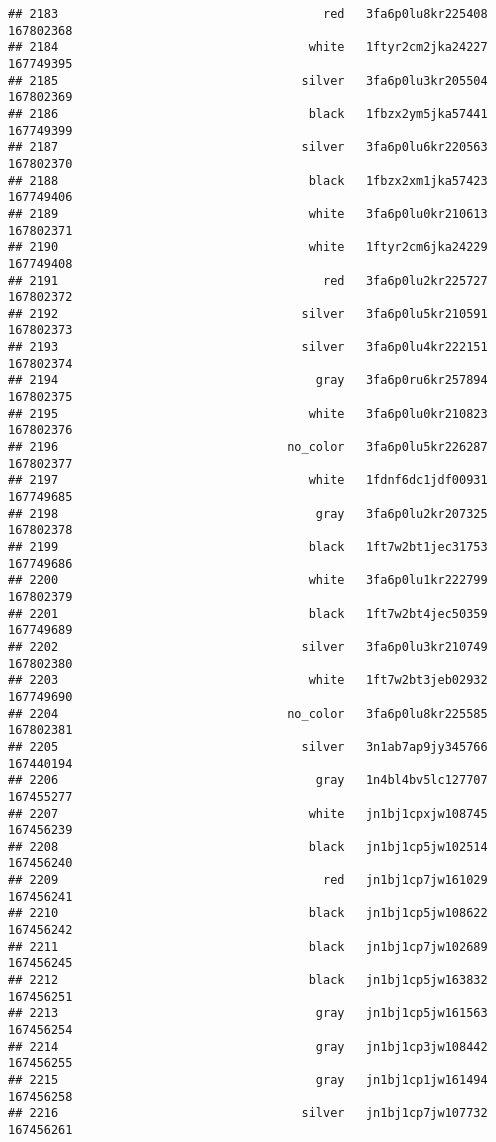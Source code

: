 \documentclass[
]{article}
\begin{document}
\begin{verbatim}
## 2183                                     red   3fa6p0lu8kr225408 167802368
## 2184                                   white   1ftyr2cm2jka24227 167749395
## 2185                                  silver   3fa6p0lu3kr205504 167802369
## 2186                                   black   1fbzx2ym5jka57441 167749399
## 2187                                  silver   3fa6p0lu6kr220563 167802370
## 2188                                   black   1fbzx2xm1jka57423 167749406
## 2189                                   white   3fa6p0lu0kr210613 167802371
## 2190                                   white   1ftyr2cm6jka24229 167749408
## 2191                                     red   3fa6p0lu2kr225727 167802372
## 2192                                  silver   3fa6p0lu5kr210591 167802373
## 2193                                  silver   3fa6p0lu4kr222151 167802374
## 2194                                    gray   3fa6p0ru6kr257894 167802375
## 2195                                   white   3fa6p0lu0kr210823 167802376
## 2196                                no_color   3fa6p0lu5kr226287 167802377
## 2197                                   white   1fdnf6dc1jdf00931 167749685
## 2198                                    gray   3fa6p0lu2kr207325 167802378
## 2199                                   black   1ft7w2bt1jec31753 167749686
## 2200                                   white   3fa6p0lu1kr222799 167802379
## 2201                                   black   1ft7w2bt4jec50359 167749689
## 2202                                  silver   3fa6p0lu3kr210749 167802380
## 2203                                   white   1ft7w2bt3jeb02932 167749690
## 2204                                no_color   3fa6p0lu8kr225585 167802381
## 2205                                  silver   3n1ab7ap9jy345766 167440194
## 2206                                    gray   1n4bl4bv5lc127707 167455277
## 2207                                   white   jn1bj1cpxjw108745 167456239
## 2208                                   black   jn1bj1cp5jw102514 167456240
## 2209                                     red   jn1bj1cp7jw161029 167456241
## 2210                                   black   jn1bj1cp5jw108622 167456242
## 2211                                   black   jn1bj1cp7jw102689 167456245
## 2212                                   black   jn1bj1cp5jw163832 167456251
## 2213                                    gray   jn1bj1cp5jw161563 167456254
## 2214                                    gray   jn1bj1cp3jw108442 167456255
## 2215                                    gray   jn1bj1cp1jw161494 167456258
## 2216                                  silver   jn1bj1cp7jw107732 167456261

\end{verbatim}
\end{document}
